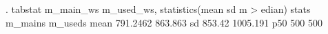 . tabstat m_main_ws m_used_ws, statistics(mean sd m
> edian)
{\smallskip}
   stats {\VBAR}  m_main{\tytilde}s  m_used{\tytilde}s
    mean {\VBAR}  791.2462   863.863
      sd {\VBAR}    853.42  1005.191
     p50 {\VBAR}       500       500
{\smallskip}
